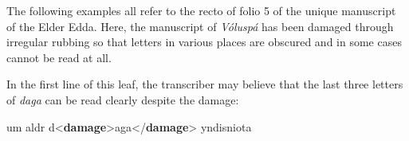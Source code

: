 \par
The following examples all refer to the recto of folio 5 of the unique manuscript of the Elder Edda. Here, the manuscript of \textit{Vóluspá} has been damaged through irregular rubbing so that letters in various places are obscured and in some cases cannot be read at all.\par
In the first line of this leaf, the transcriber may believe that the last three letters of \textit{daga} can be read clearly despite the damage: \par\bgroup{}\exampleFont \begin{shaded}\noindent\mbox{}um aldr\mbox{}\newline 
 d{<\textbf{damage}>}aga{</\textbf{damage}>} yndisniota\end{shaded}\egroup\par \par
